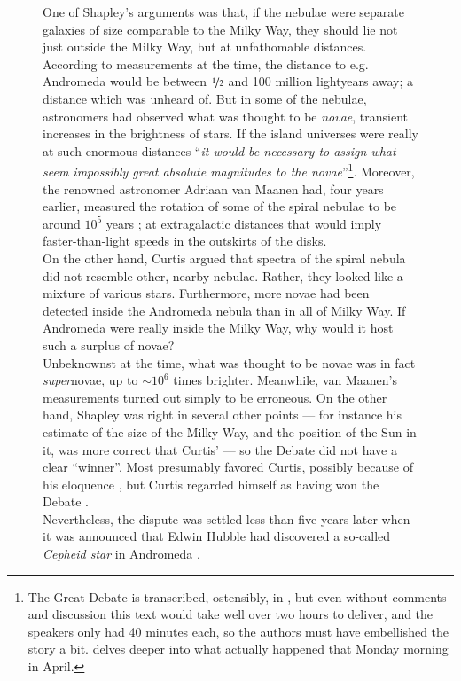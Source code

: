 \documentclass[useAMS]{aa}
\begin{document}
\begin{figure}[!t]
\begin{bclogo}[
    couleur=gray!20,
    epBord=1,
    arrondi=0.1,
    logo=\bcinfo,
    marge=8,
    ombre=false, %
    couleurBord=gray!60,
    barre=line]
{{    %
    One of Shapley's arguments was that, if the nebulae were separate galaxies of size comparable to the Milky Way, they should lie not just outside the Milky Way, but at unfathomable distances.
    According to measurements at the time, the distance to e.g. Andromeda would be between $\nicefrac{1}{2}$ and 100 million lightyears away; a distance which was unheard of.
    But in some of the nebulae, astronomers had observed what was thought to be \emph{novae}, transient increases in the brightness of stars.
    If the island universes were really at such enormous distances ``\emph{it would be necessary to assign what seem impossibly great absolute magnitudes to the novae}''\footnote{The Great Debate is transcribed, ostensibly, in \citet{Shapley1921}, but even without comments and discussion this text would take well over two hours to deliver, and the speakers only had 40 minutes each, so the authors must have embellished the story a bit. \citet{Hoskin1976} delves deeper into what actually happened that Monday morning in April.}.
    Moreover, the renowned astronomer Adriaan van Maanen had, four years earlier, measured the rotation of some of the spiral nebulae to be around $10^5$ years \citep{vanMaanen1916}; at extragalactic distances that would imply faster-than-light speeds in the outskirts of the disks.\vspace{1mm}\\
    On the other hand, Curtis argued that spectra of the spiral nebula did not resemble other, nearby nebulae.
    Rather, they looked like a mixture of various stars.
    Furthermore, more novae had been detected inside the Andromeda nebula than in all of Milky Way.
    If Andromeda were really inside the Milky Way, why would it host such a surplus of novae?\vspace{1mm}\\
    Unbeknownst at the time, what was thought to be novae was in fact \emph{super}novae, up to $\sim10^6$ times brighter.
    Meanwhile, van Maanen's measurements turned out simply to be erroneous.
    On the other hand, Shapley was right in several other points --- for instance his estimate of the size of the Milky Way, and the position of the Sun in it, was more correct that Curtis' --- so the Debate did not have a clear ``winner''.
    Most presumably favored Curtis, possibly because of his eloquence \citep{Ferris1977}, but Curtis regarded himself as having won the Debate \citep{Horvath2020}.\vspace{1mm}\\
    Nevertheless, the dispute was settled less than five years later when it was announced that Edwin Hubble had discovered a so-called \emph{Cepheid star} in Andromeda \citep{Hubble1925}.
}}
\end{bclogo}
\end{figure}
\end{document}
